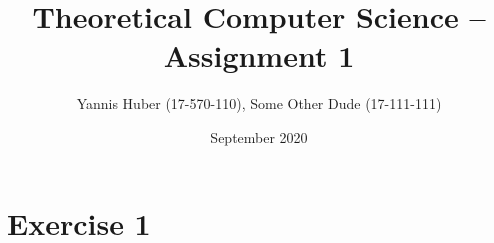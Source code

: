 \documentclass{ethz-assignment}
\title{Theoretical Computer Science -- Assignment 1}
\author{Yannis Huber (17-570-110), Some Other Dude (17-111-111)}
\date{September 2020}
\begin{document}
\maketitle
\thispagestyle{fancy}

\section*{Exercise 1}
\end{document}
